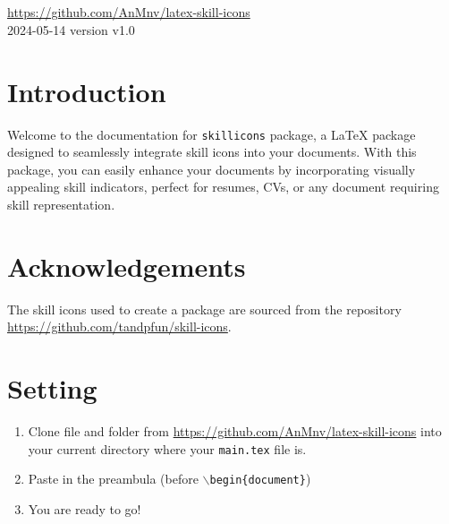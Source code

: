 \documentclass[12pt]{article}
\begin{document}
\begin{center}
\fontsize{40}{50} \\[1cm]  \\[1cm]
 
\Large \href{https://github.com/AnMnv/latex-skill-icons}{https://github.com/AnMnv/latex-skill-icons}\\[1cm]

2024-05-14 version v1.0 
\end{center}




 

\vspace*{2cm}






















 

 

\section*{Introduction}
Welcome to the documentation for \texttt{skillicons} package, a LaTeX package designed to seamlessly integrate skill icons into your documents. With this package, you can easily enhance your documents by incorporating visually appealing skill indicators, perfect for resumes, CVs, or any document requiring skill representation.


 
\section*{Acknowledgements}
The skill icons used to create a package are sourced from the repository \href{https://github.com/tandpfun/skill-icons}{https://github.com/tandpfun/skill-icons}.

\section*{Setting}
\begin{enumerate}
\item Clone  file and  folder from \href{https://github.com/AnMnv/latex-skill-icons}{https://github.com/AnMnv/latex-skill-icons} into your current directory where your \texttt{main.tex} file is.
\item Paste  in the preambula (before \texttt{$\backslash$begin\{document\}})
\item You are ready to go!
\end{enumerate}
\end{document}
